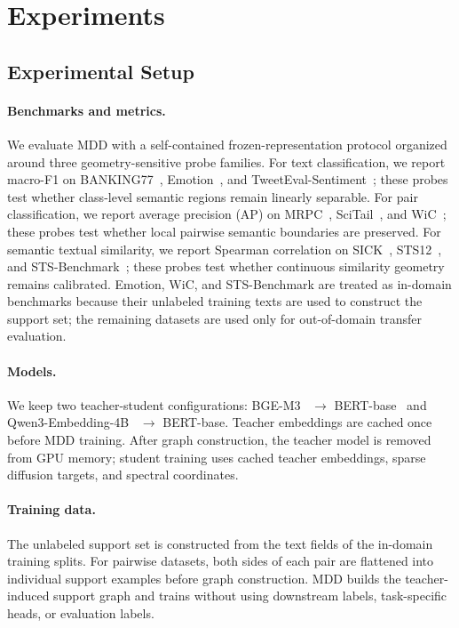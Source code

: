 \section{Experiments}

\subsection{Experimental Setup}

\paragraph{Benchmarks and metrics.}
We evaluate MDD with a self-contained frozen-representation protocol organized around three geometry-sensitive probe families. For text classification, we report macro-F1 on BANKING77~\citep{casanueva2020efficient}, Emotion~\citep{saravia2018carer}, and TweetEval-Sentiment~\citep{barbieri2020tweeteval}; these probes test whether class-level semantic regions remain linearly separable. For pair classification, we report average precision (AP) on MRPC~\citep{dolan2004automatically}, SciTail~\citep{khot2018scitail}, and WiC~\citep{pilehvar2019wic}; these probes test whether local pairwise semantic boundaries are preserved. For semantic textual similarity, we report Spearman correlation on SICK~\citep{marelli2014sick}, STS12~\citep{agirre2012semeval}, and STS-Benchmark~\citep{cer2017semeval}; these probes test whether continuous similarity geometry remains calibrated. Emotion, WiC, and STS-Benchmark are treated as in-domain benchmarks because their unlabeled training texts are used to construct the support set; the remaining datasets are used only for out-of-domain transfer evaluation.

\paragraph{Models.}
We keep two teacher-student configurations: BGE-M3~\citep{chen2024bgem3} $\rightarrow$ BERT-base~\citep{devlin2019bert} and Qwen3-Embedding-4B~\citep{zhang2025qwen3embedding} $\rightarrow$ BERT-base. Teacher embeddings are cached once before MDD training. After graph construction, the teacher model is removed from GPU memory; student training uses cached teacher embeddings, sparse diffusion targets, and spectral coordinates.

\paragraph{Training data.}
The unlabeled support set is constructed from the text fields of the in-domain training splits. For pairwise datasets, both sides of each pair are flattened into individual support examples before graph construction. MDD builds the teacher-induced support graph and trains without using downstream labels, task-specific heads, or evaluation labels.

